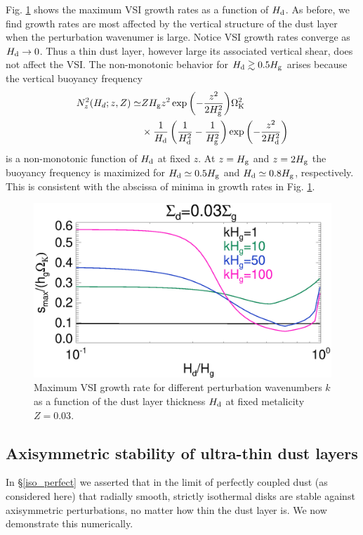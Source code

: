Fig. \ref{compare_eigenvals_fixZ} shows the maximum VSI growth rates
as a function of $H_\mathrm{d}$. As before, we find growth
rates are most affected by the vertical structure of the dust layer
when the perturbation wavenumer is large. Notice VSI growth rates converge as
$H_\mathrm{d}\to 0$. %
Thus a thin dust layer, however large its associated vertical shear,
does not affect the VSI. The non-monotonic behavior for $H_\mathrm{d}\gtrsim
0.5H_\mathrm{g}$ arises because the vertical buoyancy frequency 
\begin{align*}
N_z^2(H_d;z,Z) \simeq &ZH_\mathrm{g} z^2
\exp{\left(-\frac{z^2}{2H_\mathrm{g}^2}\right)}\Omega_{\rm K}^2\notag\\
&\times 
\frac{1}{H_\mathrm{d}}\left(\frac{1}{H_\mathrm{d}^2} -
\frac{1}{H_\mathrm{g}^2}\right)\exp{\left(-\frac{z^2}{2H_\mathrm{d}^2}\right)}  
\end{align*}
is a non-monotonic function of $H_\mathrm{d}$ at fixed $z$. At $z=H_\mathrm{g}$ and $z=2H_\mathrm{g}$
the buoyancy frequency is maximized for $H_\mathrm{d}\simeq0.5H_\mathrm{g}$ and
$H_\mathrm{d}\simeq 0.8H_\mathrm{g}$, respectively. This is consistent with the abscissa
of minima in growth rates in Fig. \ref{compare_eigenvals_fixZ}. 

\begin{figure}
  \includegraphics[width=\linewidth]{figures/compare_eigenvals_fixZ} 
  \caption{Maximum VSI growth rate for different perturbation
    wavenumbers $k$ as a function of the dust layer
    thickness $H_\mathrm{d}$ at fixed metalicity $Z=0.03$. 
    \label{compare_eigenvals_fixZ}
    }
\end{figure}

\subsection{Axisymmetric stability of ultra-thin dust layers}
In \S\ref{iso_perfect} we asserted that in the limit of perfectly
coupled dust (as considered here) that radially smooth, strictly
isothermal disks are stable against axisymmetric perturbations, no
matter how thin the dust layer is. We now demonstrate this
numerically. 

